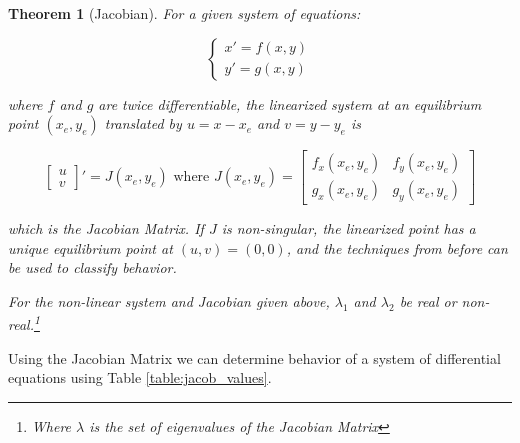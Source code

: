 \documentclass[12pt, landscape, twocolumn]{article}
\newtheorem{thm}{Theorem}
\begin{document}
    \begin{thm}[Jacobian]
        For a given system of equations:

            \[
                \begin{cases}
                    x\prime = f(x, y)\\
                    y\prime = g(x, y)
                \end{cases}
            \]

        where $f$ and $g$ are twice differentiable, the linearized system at an equilibrium point $(x_e, y_e)$ translated by $u = x - x_e$ and $v = y - y_e$ is

            \begin{equation}\label{eq:jacobian}
                \left[ \begin{array}{c}
                    u\\
                    v
                \end{array} \right] \prime = J(x_e, y_e) \text{ where } J(x_e, y_e) = 
                \left[ \begin{array}{cc}
                    f_x(x_e, y_e) & f_y(x_e, y_e)\\
                    g_x(x_e, y_e) & g_y(x_e, y_e)
                \end{array} \right]
            \end{equation}

        which is the Jacobian Matrix. If $J$ is non-singular, the linearized point has a unique equilibrium point at $(u, v) = (0,0)$, and the techniques from before can be used to classify behavior.

        For the non-linear system and Jacobian given above, $\lambda_1$ and $\lambda_2$ be real or non-real.\footnote{Where $\lambda$ is the set of eigenvalues of the Jacobian Matrix}
    \end{thm}

    Using the Jacobian Matrix we can determine behavior of a system of differential equations using Table \eqref{table:jacob_values}.
\end{document}
